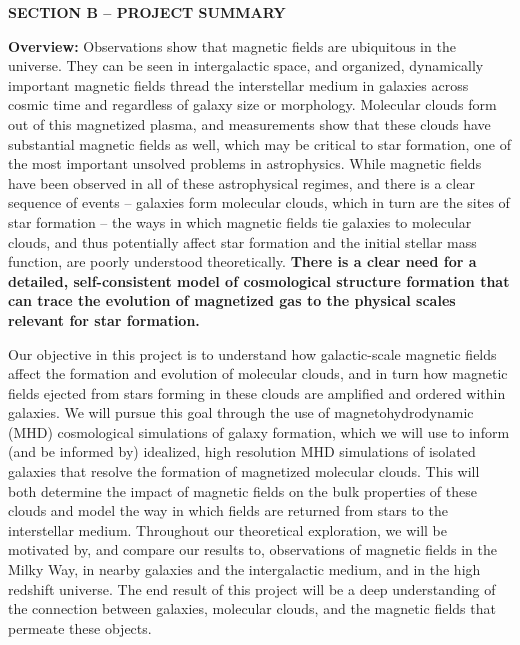 \documentclass[11pt]{article}
\begin{document}
\vspace{-6mm}
\begin{center} 
\bfseries\uppercase{Section B -- Project Summary}
\end{center}
\vspace{-2mm}


\noindent \textbf{Overview:}
Observations show that magnetic fields are ubiquitous in the universe.
They can be seen in intergalactic space, and organized, dynamically
important magnetic fields thread the interstellar medium in galaxies
across cosmic time and regardless of galaxy size or morphology.
Molecular clouds form out of this magnetized plasma, and measurements
show that these clouds have substantial magnetic fields as well, which
 may be critical to star formation,  one of
the most important unsolved problems in astrophysics.  While magnetic
fields have been observed in all of these astrophysical regimes, and
there is a clear sequence of events -- galaxies form molecular clouds,
which in turn are the sites of star formation -- the ways in which
magnetic fields tie galaxies to molecular clouds, and thus potentially
affect star formation and the initial stellar mass function, are
poorly understood theoretically.  \textbf{There is a clear need for a
detailed, self-consistent model of cosmological structure formation
that can trace the evolution of magnetized gas to the physical scales
relevant for star formation.}

Our objective in this project is to understand how galactic-scale
magnetic fields affect the formation and evolution of molecular
clouds, and in turn how magnetic fields ejected from stars forming in
these clouds are amplified and ordered within galaxies.  We will
pursue this goal through the use of magnetohydrodynamic (MHD)
cosmological simulations of galaxy formation, which we will use to
inform (and be informed by) idealized, high resolution MHD simulations
of isolated galaxies  that resolve the
formation of magnetized molecular clouds.  This will both determine the impact of
magnetic fields on the bulk properties of these clouds and model the way in which
 fields are returned from stars to the interstellar medium. 
 Throughout our theoretical exploration, we will be
motivated by, and compare our results to, observations of magnetic
fields in the Milky Way, in nearby galaxies and the intergalactic medium, and in the high redshift
universe.  The end result of this
project will be a deep understanding of the connection between
galaxies, molecular clouds, and the magnetic fields that permeate
these objects.
\end{document}
